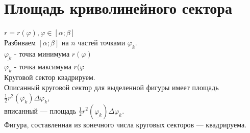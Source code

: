 \section{Площадь криволинейного сектора}
$r = r(\varphi), \varphi\in[\alpha;\beta]$\\
Разбиваем $[\alpha;\beta]$ на $n$ частей точками $\varphi_k$.\\
$\underline{\varphi_k}$ - точка минимума $r(\varphi)$\\
$\overline{\varphi_k}$ - точка максимума $r(\varphi$\\
Круговой сектор квадрируем.\\
Описанный круговой сектор для выделенной фигуры имеет площадь $\frac{1}{2} r^2(\overline{\varphi_k})\Delta\varphi_k$,\\
вписанный --- площадь $\frac{1}{2} r^2(\underline{\varphi_k})\Delta\varphi_k$.\\
Фигура, составленная из конечного числа круговых секторов --- квадрируема.